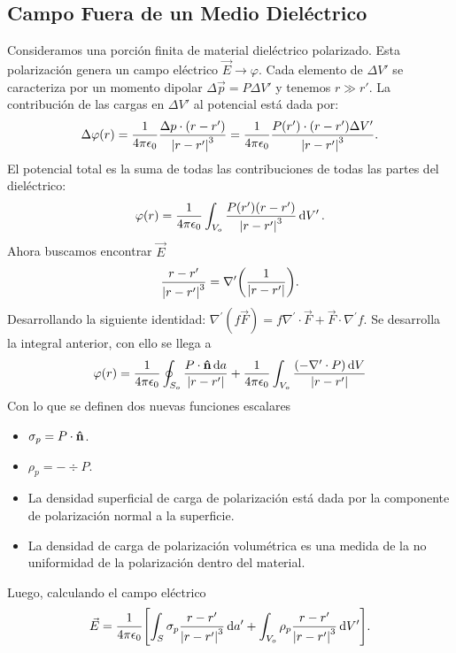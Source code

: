 \subsection{Campo Fuera de un Medio Dieléctrico}
Consideramos una porción finita de material dieléctrico polarizado. Esta polarización genera un campo eléctrico $\vec{E} \to \varphi$. Cada elemento de $\Delta V'$ se caracteriza por un momento dipolar $\Delta \vec{p} = P\Delta V'$ y tenemos $r \gg r'$. La contribución de las cargas en $\Delta V'$ al potencial está dada por:
\begin{equation}
	\Delta \varphi (r) = \frac{1}{4\pi \epsilon_0} \frac{\Delta p \cdot (r - r')}{\abs{r - r'}^3} = \frac{1}{4\pi \epsilon_0} \frac{P(r') \cdot (r - r') \Delta V'}{\abs{r - r'}^3}.
\end{equation}
El potencial total es la suma de todas las contribuciones de todas las partes del dieléctrico:
\begin{equation}
	\varphi (r) = \frac{1}{4\pi \epsilon_0} \int _{V_o} \frac{P(r') (r - r')}{\abs{r - r'}^3} \dd{V'}.
\end{equation}
Ahora buscamos encontrar $\vec{E}$
\begin{equation}
	\frac{r - r'}{\abs{r - r'}^3} = \nabla ^\prime \qty(\frac{1}{\abs{r - r'}}).
\end{equation}
Desarrollando la siguiente identidad: $\nabla ^\prime (f\vec{F}) = f\nabla ^\prime \cdot \vec{F} + \vec{F} \cdot \nabla ^\prime f.$ Se desarrolla la integral anterior, con ello se llega a 
\begin{equation}
	\varphi (r) = \frac{1}{4\pi \epsilon_0} \oint _{S_o} \frac{P \cdot \vu{n} \dd{a}}{\abs{r - r'}} + \frac{1}{4\pi \epsilon_0} \int _{V_o} \frac{(-\nabla ^\prime \cdot P) \dd{V}}{\abs{r - r'}}
\end{equation}
Con lo que se definen dos nuevas funciones escalares
\begin{itemize}
	\item $\sigma _p = P \cdot \vu{n}$.
	\item $\rho _p = -\div{P}$.
\end{itemize}

\begin{itemize}
	\item La densidad superficial de carga de polarización está dada por la componente de polarización normal a la superficie.
	\item La densidad de carga de polarización volumétrica es una medida de la no uniformidad de la polarización dentro del material.
\end{itemize}

Luego, calculando el campo eléctrico
\begin{equation}
	\vec{E} = \frac{1}{4\pi \epsilon_0} \qty[\int _S \sigma _p \frac{r - r'}{\abs{r - r'}^3} \dd{a'} + \int _{V_o} \rho _p \frac{r - r'}{\abs{r - r'}^3} \dd{V'}].
\end{equation}



